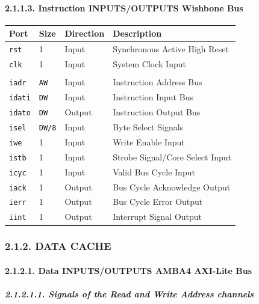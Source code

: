\documentclass[
]{article}
\begin{document}
\hypertarget{instruction-inputsoutputs-wishbone-bus}{%
\paragraph{2.1.1.3. Instruction INPUTS/OUTPUTS Wishbone
Bus}\label{instruction-inputsoutputs-wishbone-bus}}

\begin{longtable}[]{@{}llll@{}}
\toprule
Port & Size & Direction & Description\tabularnewline
\midrule
\endhead
\texttt{rst} & 1 & Input & Synchronous Active High Reset\tabularnewline
\texttt{clk} & 1 & Input & System Clock Input\tabularnewline
& & &\tabularnewline
\texttt{iadr} & \texttt{AW} & Input & Instruction Address
Bus\tabularnewline
\texttt{idati} & \texttt{DW} & Input & Instruction Input
Bus\tabularnewline
\texttt{idato} & \texttt{DW} & Output & Instruction Output
Bus\tabularnewline
\texttt{isel} & \texttt{DW/8} & Input & Byte Select
Signals\tabularnewline
\texttt{iwe} & 1 & Input & Write Enable Input\tabularnewline
\texttt{istb} & 1 & Input & Strobe Signal/Core Select
Input\tabularnewline
\texttt{icyc} & 1 & Input & Valid Bus Cycle Input\tabularnewline
\texttt{iack} & 1 & Output & Bus Cycle Acknowledge Output\tabularnewline
\texttt{ierr} & 1 & Output & Bus Cycle Error Output\tabularnewline
\texttt{iint} & 1 & Output & Interrupt Signal Output\tabularnewline
\bottomrule
\end{longtable}

\hypertarget{data-cache}{%
\subsubsection{2.1.2. DATA CACHE}\label{data-cache}}

\hypertarget{data-inputsoutputs-amba4-axi-lite-bus}{%
\paragraph{2.1.2.1. Data INPUTS/OUTPUTS AMBA4 AXI-Lite
Bus}\label{data-inputsoutputs-amba4-axi-lite-bus}}

\hypertarget{signals-of-the-read-and-write-address-channels-1}{%
\subparagraph{2.1.2.1.1. Signals of the Read and Write Address
channels}\label{signals-of-the-read-and-write-address-channels-1}}
\end{document}
